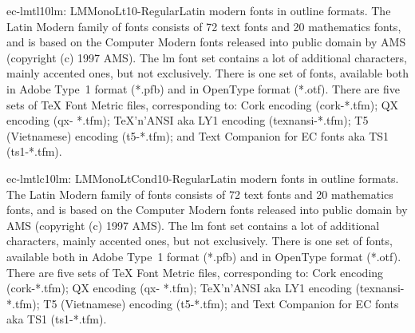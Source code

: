 \documentclass{ddltxtyp}
\begin{document}
\begin{package}{ec-lmtl10}{lm: LMMonoLt10-Regular}{Latin modern fonts in outline formats.}
The Latin Modern family of fonts consists of 72 text fonts and
20 mathematics fonts, and is based on the Computer Modern fonts
released into public domain by AMS (copyright (c) 1997 AMS).
The lm font set contains a lot of additional characters, mainly
accented ones, but not exclusively. There is one set of fonts,
available both in Adobe Type~1 format (*.pfb) and in OpenType
format (*.otf). There are five sets of {\TeX} Font Metric files,
corresponding to: Cork encoding (cork-*.tfm); QX encoding (qx-
*.tfm); {\TeX}'n'ANSI aka LY1 encoding (texnansi-*.tfm); T5
(Vietnamese) encoding (t5-*.tfm); and Text Companion for EC
fonts aka TS1 (ts1-*.tfm).
\end{package}
\begin{package}{ec-lmtlc10}{lm: LMMonoLtCond10-Regular}{Latin modern fonts in outline formats.}
The Latin Modern family of fonts consists of 72 text fonts and
20 mathematics fonts, and is based on the Computer Modern fonts
released into public domain by AMS (copyright (c) 1997 AMS).
The lm font set contains a lot of additional characters, mainly
accented ones, but not exclusively. There is one set of fonts,
available both in Adobe Type~1 format (*.pfb) and in OpenType
format (*.otf). There are five sets of {\TeX} Font Metric files,
corresponding to: Cork encoding (cork-*.tfm); QX encoding (qx-
*.tfm); {\TeX}'n'ANSI aka LY1 encoding (texnansi-*.tfm); T5
(Vietnamese) encoding (t5-*.tfm); and Text Companion for EC
fonts aka TS1 (ts1-*.tfm).
\end{package}
\end{document}
